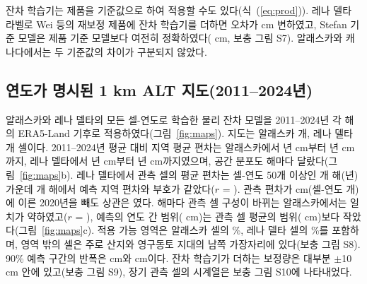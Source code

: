 잔차 학습기는 제품을 기준값으로 하여 적용할 수도 있다(식~(\ref{eq:prod})). 레나 델타 라벨로 Wei 등의 재보정 제품에 잔차 학습기를 더하면 오차가 \npadLeRpPcal{} cm 변하였고, Stefan 기준 모델은 제품 기준 모델보다 여전히 정확하였다(\npadLeRoRp{} cm, 보충 그림 S7). 알래스카와 캐나다에서는 두 기준값의 차이가 구분되지 않았다.

\subsection{연도가 명시된 1 km ALT 지도(2011--2024년)}
알래스카와 레나 델타의 모든 셀-연도로 학습한 물리 잔차 모델을 2011--2024년 각 해의 ERA5-Land 기후로 적용하였다(그림~\ref{fig:maps}). 지도는 알래스카 \nncellmapAk{}개, 레나 델타 \nncellmapLe{}개 셀이다. 2011--2024년 평균 대비 지역 평균 편차는 알래스카에서 \nanminyrAk{}년 \nanminAk{} cm부터 \nanmaxyrAk{}년 \nanmaxAk{} cm까지, 레나 델타에서 \nanminyrLe{}년 \nanminLe{} cm부터 \nanmaxyrLe{}년 \nanmaxLe{} cm까지였으며, 공간 분포도 해마다 달랐다(그림~\ref{fig:maps}b). 레나 델타에서 관측 셀의 평균 편차는 셀-연도 50개 이상인 \nanobsnLe{}개 해(\nanobsyrsLe{}년) 가운데 \nanobssameLe{}개 해에서 예측 지역 편차와 부호가 같았다($r$ = \nanobsrLe). 관측 편차가 \nanobsLeTwentyObs{} cm(셀-연도 \nanobsLeTwentyN{}개)에 이른 2020년을 빼도 상관은 \nanobsrLeNoTwenty{}였다. 해마다 관측 셀 구성이 바뀌는 알래스카에서는 일치가 약하였고($r$ = \nanobsrAk), 예측의 연도 간 범위(\nanpredrangeAk{} cm)는 관측 셀 평균의 범위(\nanobsrangeAk{} cm)보다 작았다(그림~\ref{fig:maps}c). 적용 가능 영역은 알래스카 셀의 \naoaAk\%, 레나 델타 셀의 \naoaLe\%를 포함하며, 영역 밖의 셀은 주로 산지와 영구동토 지대의 남쪽 가장자리에 있다(보충 그림 S8). 90\% 예측 구간의 반폭은 \nhwAk{} cm와 \nhwLe{} cm이다. 잔차 학습기가 더하는 보정량은 대부분 $\pm$10 cm 안에 있고(보충 그림 S9), 장기 관측 셀의 시계열은 보충 그림 S10에 나타내었다.


